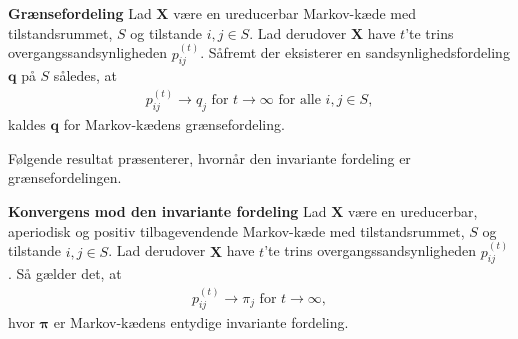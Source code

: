 \begin{minipage}\textwidth
\begin{defn}\textbf{Grænsefordeling} %
\newline
Lad $\bm X$ være en ureducerbar Markov-kæde med tilstandsrummet, $S$ og tilstande $i, j\in S$. Lad derudover $\bm X$ have $t$'te trins overgangssandsynligheden $p_{ij}^{(t)}$. Såfremt der eksisterer en sandsynlighedsfordeling $\bm q$ på $S$ således, at
\begin{align*}
    p_{ij}^{(t)}\to q_j \text{ for } t\to \infty \text{ for alle } i,j\in S,
\end{align*}
kaldes $\bm q$ for Markov-kædens grænsefordeling. 
\end{defn}
\end{minipage}



Følgende resultat præsenterer, hvornår den invariante fordeling er grænsefordelingen.

\begin{minipage}\textwidth
\begin{thmx} \textbf{Konvergens mod den invariante fordeling}\label{sæt:konvergens_for_markov} %
\newline
Lad $\bm X$ være en ureducerbar, aperiodisk og positiv tilbagevendende Markov-kæde med tilstandsrummet, $S$ og tilstande $i, j\in S$. Lad derudover $\bm X$ have $t$'te trins overgangssandsynligheden $p_{ij}^{(t)}$. Så gælder det, at 
\begin{align*}
    p_{ij}^{(t)} \to \pi_j \text{ for } t \to \infty,
\end{align*}
hvor $\bm \pi$ er Markov-kædens entydige invariante fordeling. 
\end{thmx}
\end{minipage}

